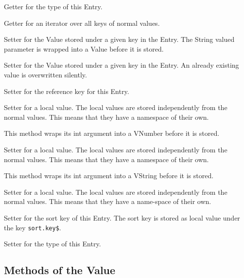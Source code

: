 \begin{methods}
    Getter for the type of this Entry.

    Getter for an iterator over all keys of normal values.

    Setter for the Value stored under a given key in the Entry. The String
    valued parameter is wrapped into a  Value before it is stored.

    Setter for the Value stored under a given key in the Entry. An already
    existing value is overwritten silently.

    Setter for the reference key for this Entry.

     Setter for a local value. The local values are stored independently from
     the normal values. This means that they have a namespace of their own.

    This method wraps its int argument into a VNumber before it is stored.

     Setter for a local value. The local values are stored independently from
     the normal values. This means that they have a namespace of their own.

     This method wraps its int argument into a VString before it is stored.

    Setter for a local value. The local values are stored independently
    from the normal values. This means that they have a name-space of
    their own.

    Setter for the sort key of this Entry. The sort key is stored as
    local value under the key \texttt{sort.key\$}.

    Setter for the type of this Entry.

\end{methods}

\subsection{Methods of the Value}

